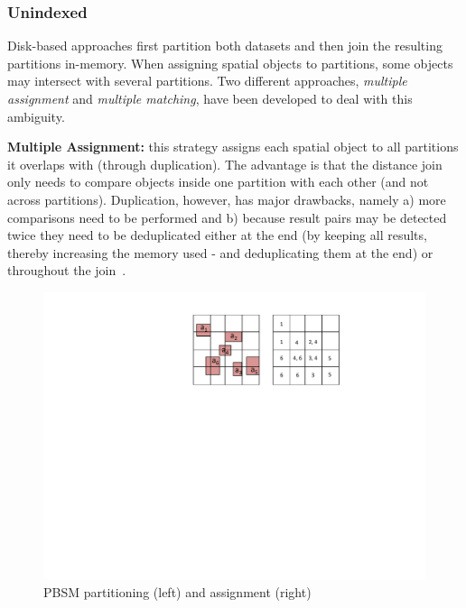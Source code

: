 \documentclass{vldb}
\begin{document}
\vspace{-2mm}
\subsubsection{Unindexed}
Disk-based approaches first partition both datasets and then join the resulting partitions in-memory. When assigning spatial objects to partitions, some objects
may intersect with several partitions. Two different approaches, \emph{multiple assignment} and \emph{multiple matching}, have been developed to deal with this
ambiguity.

\noindent\textbf{Multiple Assignment:} this strategy assigns each spatial object to all partitions it overlaps with (through duplication). The advantage is that
the distance join only needs to compare objects inside one partition with each other (and not across partitions). Duplication, however, has major drawbacks,
namely a) more comparisons need to be performed and b) because result pairs may be detected twice they need to be deduplicated either at the end (by keeping all
results, thereby increasing the memory used - and deduplicating them at the end) or throughout the join~\cite{deduplication}.

\begin{figure}[htb]
    \begin{center}
        \includegraphics[width=.8\columnwidth]{figures/PBSM}
        \vspace{-3mm}
        \caption{PBSM partitioning (left) and assignment (right)}
        \label{fig:PBSM}
      \end{center}
\vspace{-5mm}
\end{figure}
\end{document}
